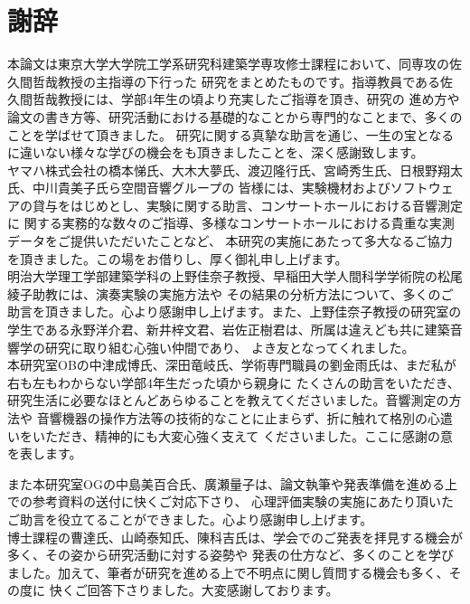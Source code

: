\documentclass[11pt,a4j,dvipdfmx, twoside]{jreport}
\begin{document}

\chapter*{謝辞} %

本論文は東京大学大学院工学系研究科建築学専攻修士課程において、同専攻の佐久間哲哉教授の主指導の下行った
研究をまとめたものです。指導教員である佐久間哲哉教授には、学部4年生の頃より充実したご指導を頂き、研究の
進め方や論文の書き方等、研究活動における基礎的なことから専門的なことまで、多くのことを学ばせて頂きました。
研究に関する真摯な助言を通じ、一生の宝となるに違いない様々な学びの機会をも頂きましたことを、深く感謝致します。
\\

ヤマハ株式会社の橋本悌氏、大木大夢氏、渡辺隆行氏、宮崎秀生氏、日根野翔太氏、中川貴美子氏ら空間音響グループの
皆様には、実験機材およびソフトウェアの貸与をはじめとし、実験に関する助言、コンサートホールにおける音響測定に
関する実務的な数々のご指導、多様なコンサートホールにおける貴重な実測データをご提供いただいたことなど、
本研究の実施にあたって多大なるご協力を頂きました。この場をお借りし、厚く御礼申し上げます。
\\

明治大学理工学部建築学科の上野佳奈子教授、早稲田大学人間科学学術院の松尾綾子助教には、演奏実験の実施方法や
その結果の分析方法について、多くのご助言を頂きました。心より感謝申し上げます。また、上野佳奈子教授の研究室の
学生である永野洋介君、新井梓文君、岩佐正樹君は、所属は違えども共に建築音響学の研究に取り組む心強い仲間であり、
よき友となってくれました。
\\

本研究室OBの中津成博氏、深田竜岐氏、学術専門職員の劉金雨氏は、まだ私が右も左もわからない学部4年生だった頃から親身に
たくさんの助言をいただき、研究生活に必要なほとんどあらゆることを教えてくださいました。音響測定の方法や
音響機器の操作方法等の技術的なことに止まらず、折に触れて格別の心遣いをいただき、精神的にも大変心強く支えて
くださいました。ここに感謝の意を表します。

また本研究室OGの中島美百合氏、廣瀬量子は、論文執筆や発表準備を進める上での参考資料の送付に快くご対応下さり、
心理評価実験の実施にあたり頂いたご助言を役立てることができました。心より感謝申し上げます。
\\

博士課程の曹達氏、山崎泰知氏、陳科吉氏は、学会でのご発表を拝見する機会が多く、その姿から研究活動に対する姿勢や
発表の仕方など、多くのことを学びました。加えて、筆者が研究を進める上で不明点に関し質問する機会も多く、その度に
快くご回答下さりました。大変感謝しております。
\\
\end{document}
